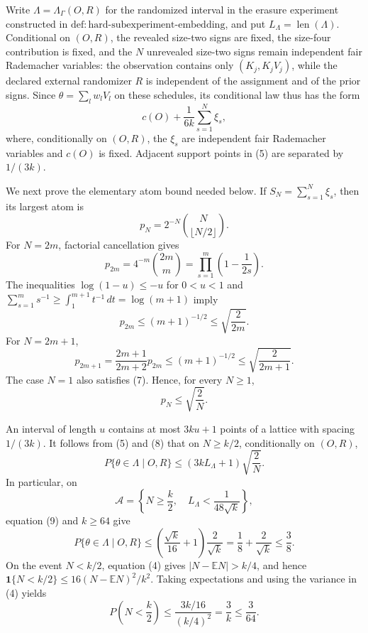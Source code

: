 Write \(\Lambda=\Lambda_\Gamma(O,R)\) for the randomized interval in
the erasure experiment constructed in
\(\mathrm{def{:}hard\text{-}subexperiment\text{-}embedding}\), and put
\(L_\Lambda=\operatorname{len}(\Lambda)\).  Conditional on \((O,R)\),
the revealed size-two signs are fixed, the size-four contribution is
fixed, and the \(N\) unrevealed size-two signs remain independent fair
Rademacher variables: the observation contains only
\((K_j,K_jV_j)\), while the declared external randomizer \(R\) is
independent of the assignment and of the prior signs.  Since
\(\theta=\sum_lw_lV_l\) on these schedules, its conditional law thus
has the form
\[
 c(O)+\frac1{6k}\sum_{s=1}^{N}\xi_s,
\tag{5}
\]
where, conditionally on \((O,R)\), the \(\xi_s\) are independent fair
Rademacher variables and \(c(O)\) is fixed.  Adjacent support points in
(5) are separated by \(1/(3k)\).

We next prove the elementary atom bound needed below.  If
\(S_N=\sum_{s=1}^N\xi_s\), then its largest atom is
\[
 p_N=2^{-N}\binom{N}{\lfloor N/2\rfloor}.
\]
For \(N=2m\), factorial cancellation gives
\[
 p_{2m}=4^{-m}\binom{2m}{m}
       =\prod_{s=1}^m\left(1-\frac1{2s}\right).
\]
The inequalities \(\log(1-u)\le-u\) for \(0<u<1\) and
\(\sum_{s=1}^m s^{-1}\ge\int_1^{m+1}t^{-1}\,dt=\log(m+1)\) imply
\[
 p_{2m}\le(m+1)^{-1/2}\le\sqrt{\frac2{2m}}.
\tag{6}
\]
For \(N=2m+1\),
\[
 p_{2m+1}=\frac{2m+1}{2m+2}p_{2m}
 \le(m+1)^{-1/2}
 \le\sqrt{\frac2{2m+1}}.
\tag{7}
\]
The case \(N=1\) also satisfies (7).  Hence, for every \(N\ge1\),
\[
 p_N\le\sqrt{\frac2N}.
\tag{8}
\]

An interval of length \(u\) contains at most \(3ku+1\) points of a
lattice with spacing \(1/(3k)\).  It follows from (5) and (8) that on
\(N\ge k/2\), conditionally on \((O,R)\),
\[
 P\{\theta\in\Lambda\mid O,R\}
 \le (3kL_\Lambda+1)\sqrt{\frac2N}.
\tag{9}
\]
In particular, on
\[
 \mathcal A=\left\{N\ge\frac k2,\quad
 L_\Lambda<\frac1{48\sqrt{k}}\right\},
\]
equation (9) and \(k\ge64\) give
\[
 P\{\theta\in\Lambda\mid O,R\}
 \le\left(\frac{\sqrt{k}}{16}+1\right)\frac2{\sqrt{k}}
 =\frac18+\frac2{\sqrt{k}}
 \le\frac38.
\tag{10}
\]
On the event \(N<k/2\), equation (4) gives
\(|N-\mathbb EN|>k/4\), and hence
\(\mathbf 1\{N<k/2\}\le16(N-\mathbb EN)^2/k^2\).  Taking
expectations and using the variance in (4) yields
\[
 P\left(N<\frac k2\right)
 \le \frac{3k/16}{(k/4)^2}
 =\frac3k\le\frac3{64}.
\tag{11}
\]

